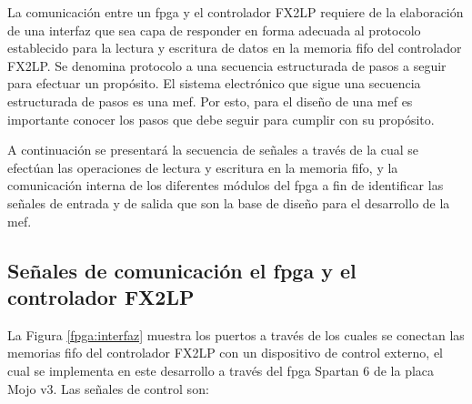 La comunicación entre un \acrshort{fpga} y el controlador FX2LP requiere de la elaboración de una interfaz que sea capa de responder en forma adecuada al protocolo establecido para la lectura y escritura de datos en la memoria \acrshort{fifo} del controlador FX2LP. Se denomina protocolo a una secuencia estructurada de pasos a seguir para efectuar un propósito. El sistema electrónico que sigue una secuencia estructurada de pasos es una \acrfull{mef}. Por esto, para el diseño de una \acrshort{mef} es importante conocer los pasos que debe seguir para cumplir con su propósito.

A continuación se presentará la secuencia de señales a través de la cual se efectúan las operaciones de lectura y escritura en la memoria \acrshort{fifo}, y la comunicación interna de los diferentes módulos del \acrshort{fpga} a fin de identificar las señales de entrada y de salida que son la base de diseño para el desarrollo de la \acrshort{mef}.




\subsection{Señales de comunicación el \acrshort{fpga} y el controlador FX2LP}

	La Figura \ref{fpga:interfaz} muestra los puertos a través de los cuales se conectan las memorias \acrshort{fifo} del controlador FX2LP con un dispositivo de control externo, el cual se implementa en este desarrollo a través del \acrshort{fpga} Spartan 6 de la placa Mojo v3. Las señales de control son:
		
